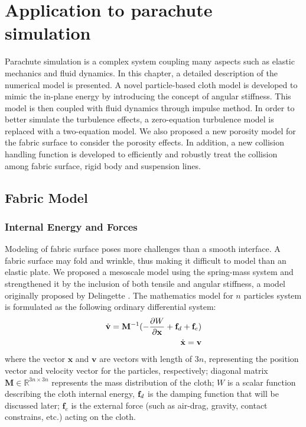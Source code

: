 \chapter{Application to parachute simulation}
Parachute simulation is a complex system coupling many aspects such as 
elastic mechanics and fluid dynamics. In this chapter, a detailed description 
of the numerical model is presented. A novel particle-based cloth model is 
developed to mimic the in-plane energy by introducing the concept of angular 
stiffness. This model is then coupled with fluid dynamics through impulse 
method. In order to better simulate the turbulence effects, a zero-equation 
turbulence model is replaced with a two-equation model. We also proposed a new 
porosity model for the fabric surface to consider the porosity effects. 
In addition, a new collision handling function is developed to efficiently and 
robustly treat the collision among fabric surface, rigid body and suspension lines.

\section{Fabric Model}
\subsection{Internal Energy and Forces}
Modeling of fabric surface poses more challenges than
a smooth interface. A fabric surface may fold and wrinkle, thus making it
difficult to model than an elastic plate. We proposed a mesoscale model using
the spring-mass system and strengthened it by the inclusion of both tensile and
angular stiffness, a model originally proposed by Delingette \cite{Delinget2008}.
The mathematics model for $n$ particles system is formulated as the following ordinary differential system:
\begin{eqnarray}
\dot{\mathbf{v}} = \mathbf{M}^{-1}(-\frac{\partial W}{\partial \mathbf{x}} 
				+ \mathbf{f}_d + \mathbf{f}_e) \label{eq:spring_model}\\
\dot{\mathbf{x}} = \mathbf{v}
\end{eqnarray}
where the vector $\mathbf{x}$ and $\mathbf{v}$ are vectors with length of $3n$, representing the position vector and velocity vector for the particles, respectively; diagonal matrix $\mathbf{M} \in \mathbb{R}^{3n\times 3n}$ represents the mass distribution of the cloth; $W$ is a scalar function describing the cloth internal energy, $\mathbf{f}_d$ is the damping function that will be discussed later; $\mathbf{f}_e$ is the external force (such as air-drag, gravity, contact constrains, etc.) acting on the cloth.

